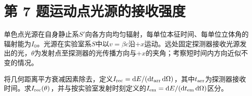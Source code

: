 \documentclass[UTF8,fontset=fandol,a4paper,11pt]{ctexart}
\newcommand{\dd}{\mathop{}\!\mathrm{d}}
\begin{document}


\section*{第 7 题\quad 运动点光源的接收强度}\label{q:7}

单色点光源在自身静止系$S'$向各方向均匀辐射，每单位本征时间、每单位立体角的辐射能为$I_0$。光源在实验室系$S$中以$v=\beta c$沿$+x$运动。远处固定探测器接收光源发出的光，$\theta$为发射点至探测器的光传播方向与$+x$的夹角；考察短时间内方向近似不变的情况。

将几何距离平方衰减因素除去，定义$I_{\rm rec}=\dd E/(\dd t_{\rm arr}\dd\Omega)$，其中$t_{\rm arr}$为探测器接收时间。求$I_{\rm rec}(\theta)$，并与按实验室发射时刻定义的$I_{\rm em}=\dd E/(\dd t_{\rm em}\dd\Omega)$区分。
\end{document}
